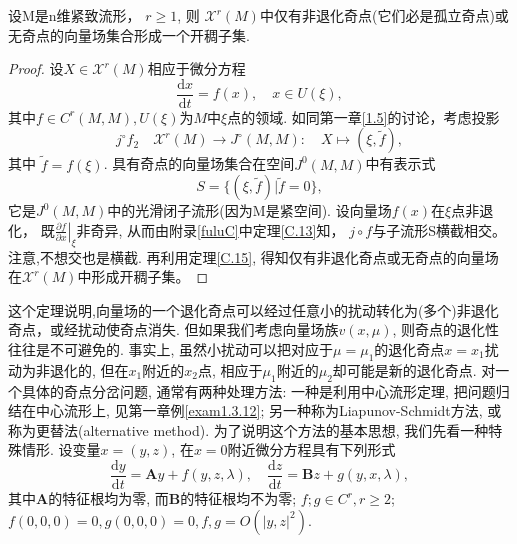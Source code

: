\begin{theorem}\label{thm2.1.4}
  设M是n维紧致流形，
  \(r \geqslant 1\),
  则
  \(\mathscr{X}^{r}(M)\)中仅有非退化奇点(它们必是孤立奇点)或无奇点的向量场集合形成一个开稠子集.
\end{theorem}
\begin{proof}
  设$X \in \mathscr{X}^{r}(M)$相应于微分方程
  \begin{equation}
\frac{\mathrm{d} x}{\mathrm{d} t}=f(x), \quad x \in U(\xi),
\end{equation}
其中\(f \in C^{r}(M, M), U(\xi)\)为\(M\)中\(\xi\)点的领域.
如同第一章\ref{1.5}的讨论，考虑投影
\begin{equation*}
j^{\circ} f_{2} \quad \mathscr{X}^{r}(M) \rightarrow J^{\circ}(M, M) : \quad X \mapsto(\xi, \tilde{f}),
\end{equation*}
其中
\(\tilde{f}=f(\xi)\).
具有奇点的向量场集合在空间\(J^{0}(M, M)\)中有表示式
\begin{equation*}
S=\{(\xi, \tilde{f}) | \tilde{f}=0\},
\end{equation*}
它是\(J^{0}(M, M)\)中的光滑闭子流形(因为M是紧空间).
设向量场\(f(x)\)在\(\xi\)点非退化，
既\(\left.\frac{\partial f}{\partial x}\right|_{\xi}\)非奇异,
从而由附录\ref{fuluC}中定理\ref{C.13}知，
\(j {\circ} f\)与子流形S横截相交。
注意,不想交也是横截.
再利用定理\ref{C.15},
得知仅有非退化奇点或无奇点的向量场在\(\mathscr{X}^{r}(M)\)中形成开稠子集。
\end{proof}
\par
这个定理说明,向量场的一个退化奇点可以经过任意小的扰动转化为(多个)非退化奇点，或经扰动使奇点消失.
但如果我们考虑向量场族\(v(x,\mu)\),
则奇点的退化性往往是不可避免的.
事实上,
虽然小扰动可以把对应于\(\mu=\mu_{1}\)的退化奇点\(x=x_{1}\)扰动为非退化的,
但在\(x_{1}\)附近的\(x_{2}\)点,
相应于\(\mu_{1}\)附近的\(\mu_{2}\)却可能是新的退化奇点.
对一个具体的奇点分岔问题,
通常有两种处理方法:
一种是利用中心流形定理,
把问题归结在中心流形上,
见第一章例\ref{exam1.3.12};
另一种称为Liapunov-Schmidt方法,
或称为更替法(alternative method).
为了说明这个方法的基本思想,
我们先看一种特殊情形.
设变量\(x=(y,z)\),
在\(x=0\)附近微分方程具有下列形式
\begin{equation}
  \label{eq2.1.2}
  \frac{\mathrm{d} y}{\mathrm{d} t}=\boldsymbol{A} y+f(y, z, \lambda),
  \quad
  \frac{\mathrm{d} z}{\mathrm{d} t}=\boldsymbol{B} z+g(y, x, \lambda),
  \end{equation}
  其中\(\boldsymbol{A}\)的特征根均为零,
  而\(\boldsymbol{B}\)的特征根均不为零;
  \(f ; g \in C^{r}, r \geqslant 2\);
  \( f(0,0,0)=0, g(0,0,0)=0, f, g=O\left(|y, z|^{2}\right)\).
